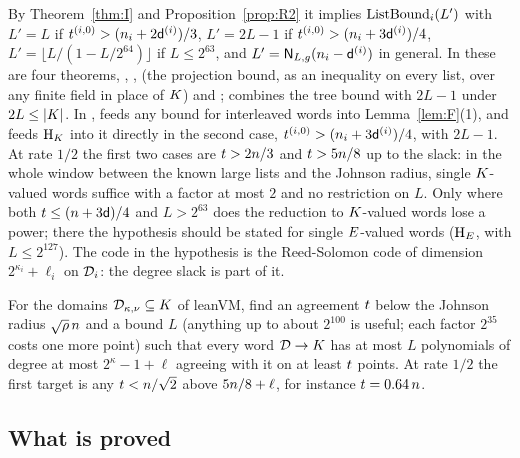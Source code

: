 By Theorem~\ref{thm:I} and Proposition~\ref{prop:R2} it implies $\mathrm{ListBound}_i(L')$ with $L'=L$ if $t^{(i,0)}>(n_i+2\mathsf{d}^{(i)})/3$, $L'=2L-1$ if $t^{(i,0)}>(n_i+3\mathsf{d}^{(i)})/4$, $L'=\lfloor L/(1-L/2^{64})\rfloor$ if $L\le2^{63}$, and $L'=\mathsf{N}_{L,g}(n_i-\mathsf{d}^{(i)})$ in general. In  these are four theorems, , ,  (the projection bound, as an inequality on every list, over any finite field in place of $K$) and ;  combines the tree bound with $2L-1$ under $2L\le|K|$. In ,  feeds any bound for interleaved words into Lemma~\ref{lem:F}(1), and  feeds $\mathrm{H}_{K}$ into it directly in the second case, $t^{(i,0)}>(n_i+3\mathsf{d}^{(i)})/4$, with $2L-1$. At rate $1/2$ the first two cases are $t>2n/3$ and $t>5n/8$ up to the slack: in the whole window between the known large lists and the Johnson radius, single $K$-valued words suffice with a factor at most $2$ and no restriction on $L$. Only where both $t\le(n+3\mathsf{d})/4$ and $L>2^{63}$ does the reduction to $K$-valued words lose a power; there the hypothesis should be stated for single $E$-valued words ($\mathrm{H}_{E}$, with $L\le2^{127}$). The code in the hypothesis is the Reed-Solomon code of dimension $2^{\kappa_i}+\ell_i$ on $\mathcal{D}_i$: the degree slack is part of it.

\begin{problem}\label{prob:list}
For the domains $\mathcal{D}_{\kappa,\nu}\subseteq K$ of leanVM, find an agreement $t$ below the Johnson radius $\sqrt{\rho}\,n$ and a bound $L$ (anything up to about $2^{100}$ is useful; each factor $2^{35}$ costs one more point) such that every word $\mathcal{D}\to K$ has at most $L$ polynomials of degree at most $2^\kappa-1+\ell$ agreeing with it on at least $t$ points. At rate $1/2$ the first target is any $t<n/\sqrt2$ above $5n/8+\ell$, for instance $t=0.64\,n$.
\end{problem}

\subsection{What is proved}\label{sec:proved}

